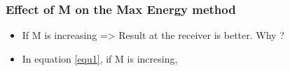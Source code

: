 \documentclass[11pt]{beamer}
\begin{document}
\begin{frame}
\frametitle{Effect of M on the Max Energy method}

\begin{itemize}

\item If M is increasing => Result at the receiver  is better. Why ?

\item In equation \ref{equ1}, if M is incresing, 



\end{itemize}



\end{frame}
\end{document}

